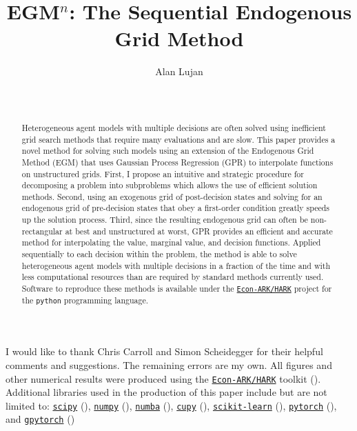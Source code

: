 \documentclass{article}
\title{EGM$^n$: The Sequential Endogenous Grid Method}
\date{\displaydate{articleDate}}
\author{Alan Lujan\footnotemark[1]\\
\\\\}
\begin{document}
\maketitle
{}

\begin{abstract}
Heterogeneous agent models with multiple decisions are often solved using inefficient grid search methods that require many evaluations and are slow.
This paper provides a novel method for solving such models using an extension of the Endogenous Grid Method (EGM) that uses Gaussian Process Regression (GPR) to interpolate functions on unstructured grids.
First, I propose an intuitive and strategic procedure for decomposing a problem into subproblems which allows the use of efficient solution methods.
Second, using an exogenous grid of post-decision states and solving for an endogenous grid of pre-decision states that obey a first-order condition greatly speeds up the solution process.
Third, since the resulting endogenous grid can often be non-rectangular at best and unstructured at worst, GPR provides an efficient and accurate method for interpolating the value, marginal value, and decision functions.
Applied sequentially to each decision within the problem, the method is able to solve heterogeneous agent models with multiple decisions in a fraction of the time and with less computational resources than are required by standard methods currently used.
Software to reproduce these methods is available under the \href{https://econ-ark.org/}{\texttt{Econ-ARK/HARK}} project for the \texttt{python} programming language.
\end{abstract}


I would like to thank Chris Carroll and Simon Scheidegger for their helpful comments and suggestions. The remaining errors are my own. All figures and other numerical results were produced using the \href{https://econ-ark.org/}{\texttt{Econ-ARK/HARK}} toolkit (\citet{Carroll2018}). Additional libraries used in the production of this paper include but are not limited to: \href{https://www.scipy.org/}{\texttt{scipy}} (\citet{Virtanen2020}), \href{https://www.numpy.org/}{\texttt{numpy}} (\citet{Harris2020}), \href{https://numba.pydata.org/}{\texttt{numba}} (\citet{Lam2015}), \href{https://cupy.dev/}{\texttt{cupy}} (\citet{Okuta2017}), \href{https://scikit-learn.org/}{\texttt{scikit-learn}} (\citet{Pedregosa2011}), \href{https://pytorch.org/}{\texttt{pytorch}} (\citet{Paszke2019}), and \href{https://gpytorch.ai/}{\texttt{gpytorch}} (\citet{Gardner2018})
\end{document}
